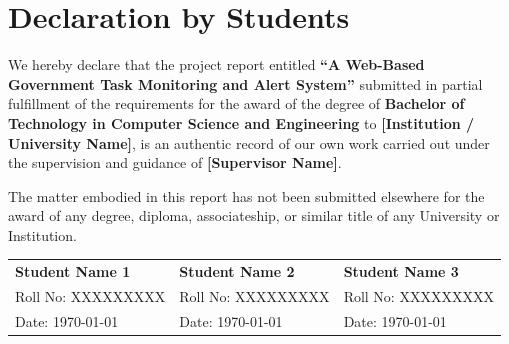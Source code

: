 \chapter*{Declaration by Students}

We hereby declare that the project report entitled \textbf{``A Web-Based Government Task Monitoring and Alert System''} submitted in partial fulfillment of the requirements for the award of the degree of \textbf{Bachelor of Technology in Computer Science and Engineering} to \textbf{[Institution / University Name]}, is an authentic record of our own work carried out under the supervision and guidance of \textbf{[Supervisor Name]}.

The matter embodied in this report has not been submitted elsewhere for the award of any degree, diploma, associateship, or similar title of any University or Institution.

\vspace{2.5cm}

\noindent
\begin{tabular}{@{}p{5cm}p{5cm}p{5cm}@{}}
    \textbf{Student Name 1} & \textbf{Student Name 2} & \textbf{Student Name 3} \\
    Roll No: XXXXXXXXX & Roll No: XXXXXXXXX & Roll No: XXXXXXXXX \\
    Date: \today & Date: \today & Date: \today \\
\end{tabular}

\clearpage
